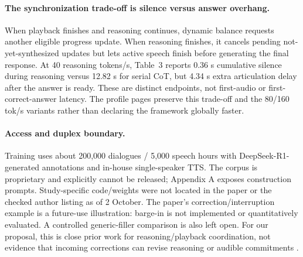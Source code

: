 \paragraph{The synchronization trade-off is silence versus answer overhang.}
When playback finishes and reasoning continues, dynamic balance requests another eligible progress update. When reasoning finishes, it cancels pending not-yet-synthesized updates but lets active speech finish before generating the final response. At 40 reasoning tokens/s, Table~3 reports 0.36 s cumulative silence during reasoning versus 12.82 s for serial CoT, but 4.34 s extra articulation delay after the answer is ready. These are distinct endpoints, not first-audio or first-correct-answer latency. The profile pages preserve this trade-off and the 80/160 tok/s variants rather than declaring the framework globally faster.
\paragraph{Access and duplex boundary.}
Training uses about 200,000 dialogues / 5,000 speech hours with DeepSeek-R1-generated annotations and in-house single-speaker TTS. The corpus is proprietary and explicitly cannot be released; Appendix A exposes construction prompts. Study-specific code/weights were not located in the paper or the checked author listing as of 2 October. The paper's correction/interruption example is a future-use illustration: barge-in is not implemented or quantitatively evaluated. A controlled generic-filler comparison is also left open. For our proposal, this is close prior work for reasoning/playback coordination, not evidence that incoming corrections can revise reasoning or audible commitments \citep{thinkaloud}.
\clearpage
